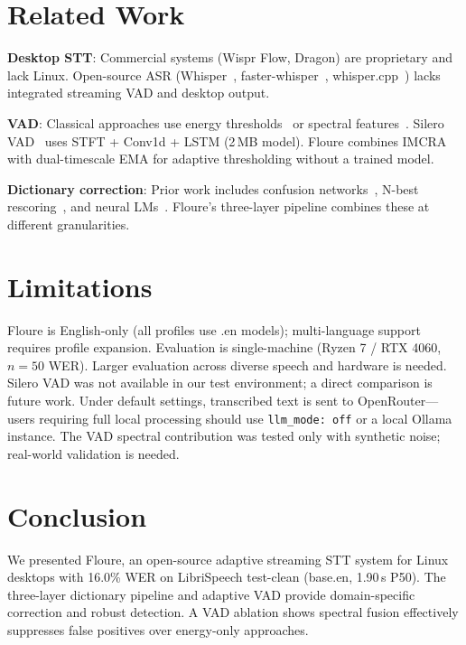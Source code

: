 \documentclass[11pt]{article}
\begin{document}
\section{Related Work}

\textbf{Desktop STT}: Commercial systems (Wispr Flow, Dragon) are proprietary and lack
Linux. Open-source ASR (Whisper~\cite{radford2023robust},
faster-whisper~\cite{faster_whisper}, whisper.cpp~\cite{whisper_cpp}) lacks integrated
streaming VAD and desktop output.

\textbf{VAD}: Classical approaches use energy thresholds~\cite{ITUG.729} or spectral
features~\cite{spectral_vad}. Silero VAD~\cite{silero2024v5} uses STFT + Conv1d + LSTM
(2\,MB model). Floure combines IMCRA~\cite{cohen2003imcra} with dual-timescale
EMA for adaptive thresholding without a trained model.

\textbf{Dictionary correction}: Prior work includes confusion
networks~\cite{confusion_networks}, N-best rescoring~\cite{nbest_rescoring}, and neural
LMs~\cite{neural_lm_post}. Floure's three-layer pipeline combines these at different
granularities.

\section{Limitations}

Floure is English-only (all profiles use .en models); multi-language support requires
profile expansion. Evaluation is single-machine (Ryzen 7 / RTX 4060, $n=50$ WER).
Larger evaluation across diverse speech and hardware is needed. Silero VAD was not
available in our test environment; a direct comparison is future work. Under default
settings, transcribed text is sent to OpenRouter---users requiring full local processing
should use \texttt{llm\_mode: off} or a local Ollama instance. The VAD spectral
contribution was tested only with synthetic noise; real-world validation is needed.



\section{Conclusion}

We presented Floure, an open-source adaptive streaming STT system for Linux desktops
with 16.0\% WER on LibriSpeech test-clean (base.en, 1.90\,s P50). The three-layer
dictionary pipeline and adaptive VAD provide domain-specific correction and robust
detection. A VAD ablation shows spectral fusion effectively suppresses false positives
over energy-only approaches.
\end{document}
